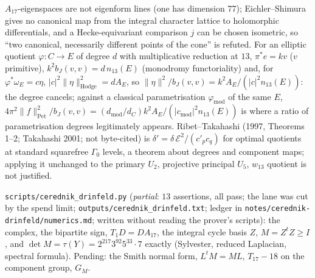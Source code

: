 \begin{proposition}
\label{prop:degree-and-norm-ratio}
$A_{17}$-eigenspaces are not eigenform lines (one has dimension $77$); Eichler--Shimura gives no canonical map from the integral
character lattice to holomorphic differentials, and a Hecke-equivariant comparison $j$ can be chosen isometric, so ``two
canonical, necessarily different points of the cone'' is refuted. For an elliptic quotient $\varphi: C\to E$ of degree $d$ with
multiplicative reduction at $13$, $\pi^{*}e = kv$ ($v$ primitive), $k^2b_J(v,v) = d\,n_{13}(E)$ (monodromy functoriality) and, for
$\varphi^{*}\omega_E = c\eta$, $|c|^2\|\eta\|^2_{\mathrm{Hodge}} = dA_E$, so $\|\eta\|^2/b_J(v,v) = k^2A_E/(|c|^2n_{13}(E))$: the degree cancels; against a
classical parametrisation $\varphi_{\mathrm{mod}}$ of the same $E$, $4\pi^2\|f\|^2_{\mathrm{Pet}}/b_J(v,v) = (d_{\mathrm{mod}}/d_C)k^2A_E/(|c_{\mathrm{mod}}|^2n_{13}(E))$
is where a ratio of parametrisation degrees legitimately appears. Ribet--Takahashi (1997, Theorems 1--2; Takahashi 2001; not
byte-cited) is $\delta' = \delta\,\mathcal E^2/(c'_pc_q)$ for optimal quotients at standard squarefree $\Gamma_0$ levels, a theorem about degrees and
component maps; applying it unchanged to the primary $U_2$, projective principal $U_5$, $w_{13}$ quotient is not justified.
\end{proposition}

\begin{numerical}
\label{num:cerednik-drinfeld}
\texttt{scripts/cerednik\_drinfeld.py} (\emph{partial}: $13$ assertions, all pass; the lane was cut by the spend limit; \texttt{outputs/cerednik\_drinfeld.txt}; ledger in \texttt{notes/cerednik-drinfeld/numerics.md}; written without reading the prover's scripts): the complex, the bipartite sign, $T_1D = DA_{17}$, the integral cycle basis $Z$, $M = Z^{t}Z\ge I$, and $\det M = \tau(Y) = 2^{217}3^{92}5^{33}\cdot7$ exactly (Sylvester, reduced Laplacian, spectral formula). Pending: the Smith normal form, $L^{t}M = ML$, $T_{17}-18$ on the component group, $G_M$.
\end{numerical}

